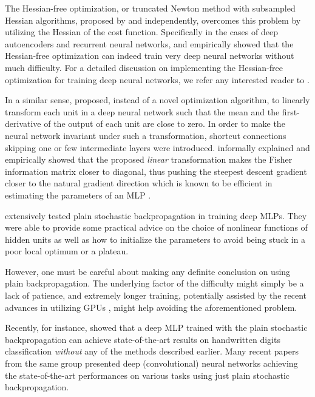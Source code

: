 \documentclass[dissertation,nocontribution,draft*]{aaltoseries}
\begin{document}
The Hessian-free optimization, or truncated Newton method with
subsampled Hessian algorithms, proposed by
\citet{Martens2010} and \citet{Byrd2011} independently,
overcomes this problem by utilizing the Hessian of the cost
function. Specifically in the cases of deep autoencoders and
recurrent neural networks, \citet{Martens2010} and
\citet{Sutskever2011} empirically showed that the
Hessian-free optimization can indeed train very deep neural
networks without much difficulty. For a detailed discussion
on implementing the Hessian-free optimization for training
deep neural networks, we refer any interested reader to
\citep{Martens2012}.

In a similar sense, \citet{Raiko2012} proposed, instead of a
novel optimization algorithm, to linearly transform each
unit in a deep neural network such that the mean and the
first-derivative of the output of each unit are close to
zero. In order to make the neural network invariant under
such a transformation, shortcut connections skipping one or
few intermediate layers were introduced. \citet{Raiko2012}
informally explained and empirically showed that the
proposed \textit{linear} transformation makes the Fisher
information matrix closer to diagonal, thus pushing the
steepest descent gradient closer to the natural gradient
direction which is known to be efficient in estimating the
parameters of an MLP \citep{Amari1998}.

\citet{Glorot2010} extensively tested plain stochastic
backpropagation in training deep MLPs. They were able to
provide some practical advice on the choice of nonlinear
functions of hidden units as well as how to initialize the
parameters to avoid being stuck in a poor
local optimum or a plateau.

However, one must be careful about making any definite
conclusion on using plain backpropagation. The
underlying factor of the difficulty might simply be a lack
of patience, and extremely longer training, potentially
assisted by the recent advances in utilizing GPUs
\citep{Raina2009}, might help avoiding the aforementioned
problem.

Recently, for instance, \citet{Ciresan2012g} showed that a
deep MLP trained with the plain stochastic backpropagation
can achieve state-of-the-art results on handwritten
digits classification \textit{without} any of the methods
described earlier. Many recent papers from the same group
\citep[see, e.g.][]{Ciresan2012c,Ciresan2012b,Ciresan2012f}
presented deep (convolutional) neural networks  achieving
the state-of-the-art performances on various tasks
using just plain stochastic backpropagation.
\end{document}
